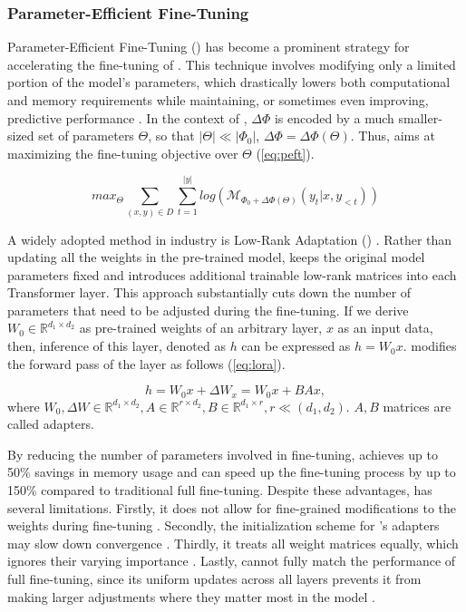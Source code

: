     \subsubsection{Parameter-Efficient Fine-Tuning}

        Parameter-Efficient Fine-Tuning (\peft{}) has become a prominent strategy for accelerating the fine-tuning of \llms{}. This technique involves modifying only a limited portion of the model’s parameters, which drastically lowers both computational and memory requirements while maintaining, or sometimes even improving, predictive performance \cite{han2024parameterefficientfinetuninglargemodels}. In the context of \peft{}, $\Delta \Phi$ is encoded by a much smaller-sized set of parameters $\Theta$, so that $|\Theta| \ll |\Phi_0|$, $\Delta \Phi = \Delta \Phi (\Theta)$. Thus, \peft{} aims at maximizing the fine-tuning objective over $\Theta$ (\ref{eq:peft}). 

        \begin{equation}\label{eq:peft}
            max_{\Theta} \sum_{(x, y) \in D} \sum_{t=1}^{|y|} log (\mathcal{M}_{{\Phi}_0 + \Delta \Phi (\Theta)} (y_t | x, y_{< t}))
        \end{equation}

        A widely adopted method in industry is Low-Rank Adaptation (\lora{}) \cite{lora}. Rather than updating all the weights in the pre-trained model, \lora{} keeps the original model parameters fixed and introduces additional trainable low-rank matrices into each Transformer layer. This approach substantially cuts down the number of parameters that need to be adjusted during the fine-tuning. If we derive $W_0 \in \mathbb{R}^{d_1 \times d_2}$ as pre-trained weights of an arbitrary layer, $x$ as an input data, then, inference of this layer, denoted as $h$ can be expressed as \(h = W_0x\). \lora{} modifies the forward pass of the layer as follows (\ref{eq:lora}). 

        \begin{equation}\label{eq:lora}
            h = W_0x + \Delta W_x = W_0x + BAx,
        \end{equation}
        where $W_0, \Delta W \in \mathbb{R}^{d_1 \times d_2}, A \in \mathbb{R}^{r \times d_2}, B \in \mathbb{R}^{d_1 \times r}, r \ll (d_1, d_2)$. $A, B$ matrices are called \lora{} adapters. 

        By reducing the number of parameters involved in fine-tuning, \lora{} achieves up to 50\% savings in memory usage and can speed up the fine-tuning process by up to 150\% compared to traditional full fine-tuning. Despite these advantages, \lora{} has several limitations. Firstly, it does not allow for fine-grained modifications to the weights during fine-tuning \cite{dora}. Secondly, the initialization scheme for \lora{}’s adapters may slow down convergence \cite{pissa}. Thirdly, it treats all weight matrices equally, which ignores their varying importance \cite{adalora}. Lastly, \lora{} cannot fully match the performance of full fine-tuning, since its uniform updates across all layers prevents it from making larger adjustments where they matter most in the model \cite{Demidovskij2024}.
        
